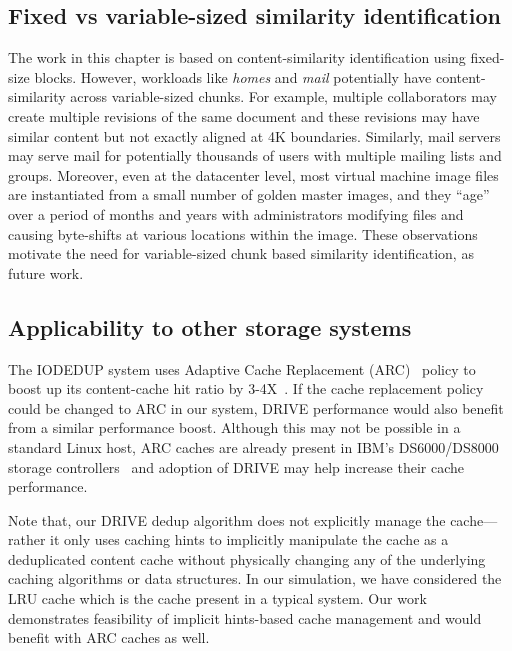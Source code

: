 

\subsection{Fixed vs variable-sized similarity identification}
The work in this chapter is based on content-similarity identification using
fixed-size blocks. However, workloads like \textit{homes} and \textit{mail}
potentially have content-similarity across variable-sized chunks. For
example, multiple collaborators may create multiple revisions of the
same document and these revisions may have similar content but not
exactly aligned at 4K boundaries. Similarly, mail servers may serve mail for
potentially thousands of users with multiple mailing lists and groups.
Moreover, even at the datacenter level, most virtual machine image
files are instantiated from a small number of golden master images\cite{vdn},
and they ``age'' over a period of months and years with 
administrators modifying files and causing byte-shifts
at various locations within the image\cite{similarity}. 
These observations motivate the need for variable-sized chunk based similarity 
identification, as future work.

\subsection{Applicability to other storage systems}
The IODEDUP system uses Adaptive Cache Replacement 
(ARC)~\cite{ARC, outperforming-LRU}
policy to boost up its content-cache hit ratio by 3-4X~\cite{iodedup}.
If the cache replacement policy could be changed to ARC in our 
system, DRIVE performance would also benefit from a similar performance 
boost. Although this may not be possible in a standard Linux host, ARC 
caches are already present in IBM's DS6000/DS8000 storage 
controllers~\cite{wikipedia-arc} and adoption of DRIVE may
help increase their cache performance.

Note that, our DRIVE dedup algorithm does not explicitly manage 
the cache---rather it only uses caching hints to implicitly manipulate 
the cache as a deduplicated content cache without physically changing 
any of the underlying caching algorithms or data structures. In our 
simulation, we have considered the LRU cache which is the cache 
present in a typical system. Our work demonstrates feasibility of 
implicit hints-based cache management and would benefit with ARC 
caches as well.

